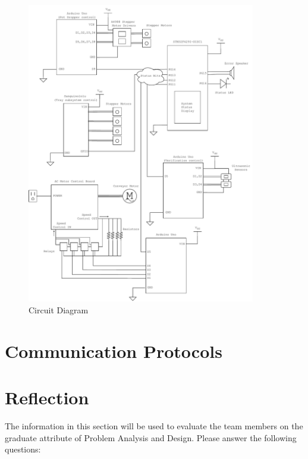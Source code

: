 \documentclass[12pt, titlepage]{article}
\begin{document}
\begin{figure}[H]
  \centering
  \includegraphics[width=0.89\textwidth]{circuit_diagram.pdf}
  \caption{Circuit Diagram}
  \label{fig:circuit}
\end{figure}

\section{Communication Protocols}

\section{Reflection}

The information in this section will be used to evaluate the team members on the
graduate attribute of Problem Analysis and Design.  Please answer the following questions:
\end{document}
